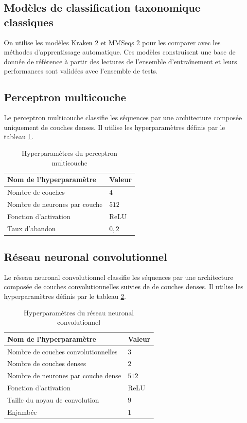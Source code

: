 \subsection{Modèles de classification taxonomique classiques}
On utilise les modèles Kraken 2 \cite{kraken} et MMSeqs 2 \cite{mmseqs2} pour les comparer avec les
méthodes d'apprentissage automatique. Ces modèles construisent une base de donnée de référence à
partir des lectures de l'ensemble d'entraînement et leurs performances sont validées avec l'ensemble
de tests.

\subsection{Perceptron multicouche}
Le perceptron multicouche classifie les séquences par une architecture composée uniquement de
couches denses. Il utilise les hyperparamètres définis par le tableau
\ref{tableau:mlp_hyperparametre}.

\begin{table}[hbt!]
    \centering
    \begin{tabular}{ll}
\hline
Nom de l'hyperparamètre & Valeur \\
\hline
Nombre de couches & $4$ \\
Nombre de neurones par couche & $512$ \\
Fonction d'activation & ReLU \\
Taux d'abandon & $0,2$ \\
\hline
    \end{tabular}
    \caption{Hyperparamètres du perceptron multicouche}
    \label{tableau:mlp_hyperparametre}
\end{table}

\subsection{Réseau neuronal convolutionnel}
Le réseau neuronal convolutionnel classifie les séquences par une architecture composée de couches
convolutionnelles suivies de de couches denses. Il utilise les hyperparamètres définis par le tableau
\ref{tableau:cnn_hyperparametre}.

\begin{table}[hbt!]
    \centering
    \begin{tabular}{ll}
\hline
Nom de l'hyperparamètre & Valeur \\
\hline
Nombre de couches convolutionnelles & $3$ \\
Nombre de couches denses & $2$ \\
Nombre de neurones par couche dense & $512$ \\
Fonction d'activation & ReLU \\
Taille du noyau de convolution & $9$ \\
Enjambée & $1$ \\
\hline
    \end{tabular}
    \caption{Hyperparamètres du réseau neuronal convolutionnel}
    \label{tableau:cnn_hyperparametre}
\end{table}

